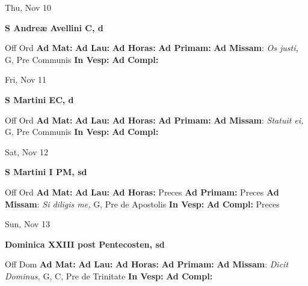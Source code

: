 \documentclass[10pt]{article}
\begin{document}
\begin{minipage}{3.5in}
\vspace{2em}\begin{center}
Thu, Nov 10
\end{center}\textbf{ \large S Andreæ Avellini C, \textnormal{\normalsize d}}
\begin{justify}
Off Ord
\textbf{Ad Mat: }
\textbf{Ad Lau: }
\textbf{Ad Horas: }
\textbf{Ad Primam: }
\textbf{Ad Missam}: \textit{Os justi,} G, Pre Communis
\textbf{In Vesp: }
\textbf{Ad Compl: }\end{justify}
\end{minipage}



\begin{minipage}{3.5in}
\vspace{2em}\begin{center}
Fri, Nov 11
\end{center}\textbf{ \large S Martini  EC, \textnormal{\normalsize d}}
\begin{justify}
Off Ord
\textbf{Ad Mat: }
\textbf{Ad Lau: }
\textbf{Ad Horas: }
\textbf{Ad Primam: }
\textbf{Ad Missam}: \textit{Statuit ei,} G, Pre Communis
\textbf{In Vesp: }
\textbf{Ad Compl: }\end{justify}
\end{minipage}



\begin{minipage}{3.5in}
\vspace{2em}\begin{center}
Sat, Nov 12
\end{center}\textbf{ \large S Martini I PM, \textnormal{\normalsize sd}}
\begin{justify}
Off Ord
\textbf{Ad Mat: }
\textbf{Ad Lau: }
\textbf{Ad Horas: }Preces
\textbf{Ad Primam: }Preces
\textbf{Ad Missam}: \textit{Si diligis me,} G, Pre de Apostolis
\textbf{In Vesp: }
\textbf{Ad Compl: }Preces\end{justify}
\end{minipage}



\begin{minipage}{3.5in}
\vspace{2em}\begin{center}
Sun, Nov 13
\end{center}\textbf{ \large Dominica XXIII post Pentecosten, \textnormal{\normalsize sd}}
\begin{justify}
Off Dom
\textbf{Ad Mat: }
\textbf{Ad Lau: }
\textbf{Ad Horas: }
\textbf{Ad Primam: }
\textbf{Ad Missam}: \textit{Dicit Dominus,} G, C, Pre de Trinitate
\textbf{In Vesp: }
\textbf{Ad Compl: }\end{justify}
\end{minipage}
\end{document}

